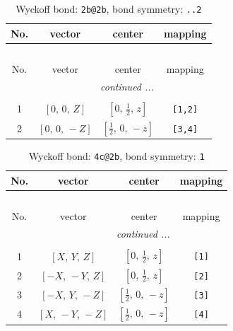 \documentclass[fleqn,8pt]{jsarticle}
\begin{document}
\renewcommand{\arraystretch}{1.2}
\begin{longtable}{cccc}
\caption{Wyckoff bond: {\tt 2b@2b}, bond symmetry: {\tt ..2}}
 \\
 \hline \hline
No. & vector & center & mapping \\ \hline \endfirsthead

\multicolumn{3}{l}{\tablename\ \thetable{}} \\
 \hline \hline
No. & vector & center & mapping \\ \hline \endhead

 \hline \hline
\multicolumn{3}{r}{\footnotesize\it continued ...} \\ \endfoot

 \hline \hline
\multicolumn{3}{r}{} \\ \endlastfoot

1 & $\left[ 0,\, 0,\, Z \right]$ & $\left[ 0,\, \frac{1}{2},\, z \right]$ & {\tt [1,2]} \\ \hline
2 & $\left[ 0,\, 0,\, - Z \right]$ & $\left[ \frac{1}{2},\, 0,\, - z \right]$ & {\tt [3,4]} \\
\end{longtable}
\renewcommand{\arraystretch}{1.2}
\begin{longtable}{cccc}
\caption{Wyckoff bond: {\tt 4c@2b}, bond symmetry: {\tt 1}}
 \\
 \hline \hline
No. & vector & center & mapping \\ \hline \endfirsthead

\multicolumn{3}{l}{\tablename\ \thetable{}} \\
 \hline \hline
No. & vector & center & mapping \\ \hline \endhead

 \hline \hline
\multicolumn{3}{r}{\footnotesize\it continued ...} \\ \endfoot

 \hline \hline
\multicolumn{3}{r}{} \\ \endlastfoot

1 & $\left[ X,\, Y,\, Z \right]$ & $\left[ 0,\, \frac{1}{2},\, z \right]$ & {\tt [1]} \\ \hline
2 & $\left[ - X,\, - Y,\, Z \right]$ & $\left[ 0,\, \frac{1}{2},\, z \right]$ & {\tt [2]} \\ \hline
3 & $\left[ - X,\, Y,\, - Z \right]$ & $\left[ \frac{1}{2},\, 0,\, - z \right]$ & {\tt [3]} \\ \hline
4 & $\left[ X,\, - Y,\, - Z \right]$ & $\left[ \frac{1}{2},\, 0,\, - z \right]$ & {\tt [4]} \\
\end{longtable}
\end{document}
